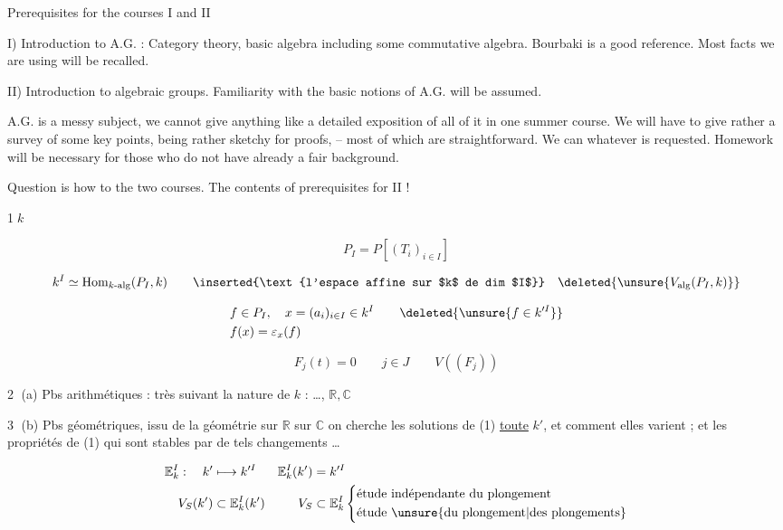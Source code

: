 
Prerequisites for the courses I and II

I) Introduction to A.G. : Category theory, basic algebra including some commutative algebra. Bourbaki is a good reference. Most facts we are using will be recalled.

II) Introduction to algebraic groups. Familiarity with the basic notions of A.G. will be assumed.

A.G. is a messy subject,  we cannot give anything like a detailed exposition of all of it in one summer course. We will have to give rather a survey of some key points, being rather sketchy for proofs, -- most of which are straightforward. We can  whatever is requested. Homework will be necessary for those who do not have already a fair background.

Question is how to  the two courses. The contents of   prerequisites for II !

\textcircled{1}\quad $k$

\[
P_I=P[(T_i)_{i\in I}]
\]

\[
k^I\simeq\mathrm{Hom}_{k\text{-}\mathrm{alg}}(P_I,k)
\qquad\inserted{\text{l'espace affine sur $k$ de dim $I$}}\quad\deleted{\unsure{V_{\mathrm{alg}}(P_I,k)}}
\]


\[
\begin{aligned}
&f\in P_I,\quad x=(a_i)_{i\in I}\in k^I\qquad\deleted{\unsure{f\in k^{\prime I}}}\\
&f(x)=\varepsilon_x(f)
\end{aligned}
\]

\[
F_j(t)=0\qquad j\in J\qquad V((F_j)) \tag*{(1)}
\]

\textcircled{2} (a) Pbs  arithmétiques : très  suivant la nature de $k$ : \ldots, $\mathbb R,\mathbb C$

\textcircled{3} (b) Pbs  géométriques, issu de la géométrie sur $\mathbb R$  sur $\mathbb C$ on cherche les solutions de (1)  \uline{toute}   $k'$,  et comment elles varient ; et les propriétés de (1) qui sont stables par de tels changements \ldots

\[
\begin{aligned}
\mathbb E_k^I:\quad k'&\longmapsto k^{\prime I} &\mathbb E_k^I(k')&=k^{\prime I}\\
V_S(k')&\subset\mathbb E_k^I(k') & V_S&\subset\mathbb E_k^I
\left\{\begin{aligned}&\text{étude indépendante du plongement}\\ &\text{étude \unsure{du plongement|des plongements}}\end{aligned}\right.
\end{aligned}
\]

